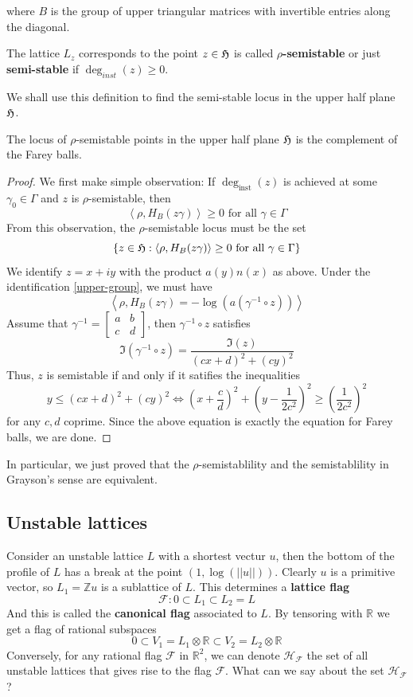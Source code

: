 where $B$ is the group of upper triangular matrices with invertible entries along the diagonal. 
\begin{definition}
  The lattice $L_z$ corresponds to the point $z \in \operatorname{\mathfrak{H}}$ is called \textbf{$\rho$-semistable} or just \textbf{semi-stable}
  if $\deg_{inst}(z) \ge 0$.
\end{definition}
We shall use this definition to find the semi-stable locus in the upper half plane $\operatorname{\mathfrak{H}}$. 
\begin{prop}
  The locus of $\rho$-semistable points in the upper half plane $\operatorname{\mathfrak{H}}$ is the 
  complement of the Farey balls. 
\end{prop}
\begin{proof}
  We first make simple observation: If $\deg_{\text{inst}}(z)$ is achieved at some 
  $\gamma_0 \in \Gamma$ and $z$ is $\rho$-semistable, then 
  \[\left\langle \rho, H_B(z\gamma)\right\rangle \ge 0 \mbox{ for all } \gamma \in \Gamma\]
  From this observation, the $\rho$-semistable locus must be the set 
  \[ \left\lbrace z \in \operatorname{\mathfrak{H}}: \left\langle \rho, H_B(z\gamma)\right\rangle \ge 0 \mbox{ for all } \gamma \in \Gamma \right\rbrace\]
We identify $z=x+iy$ with the product $a(y)n(x)$ as above. Under the identification \ref{upper-group}, we must have 
\[\left\langle \rho, H_B(z\gamma) = -\log(a(\gamma^{-1} \circ z)) \right\rangle\]
Assume that $\gamma^{-1} = 
\begin{bmatrix}
  a & b\\
  c & d
\end{bmatrix}$, then $\gamma^{-1} \circ z$ satisfies
\[\Im(\gamma^{-1}\circ z) = \dfrac{\Im(z)}{(cx+d)^2+(cy)^2}\]
Thus, $z$ is semistable if and only if it satifies the inequalities
\[y \le(cx+d)^2+(cy)^2  \Leftrightarrow \left(x+\dfrac{c}{d}\right)^2+\left(y-\dfrac{1}{2c^2}\right)^2 \ge \left(\dfrac{1}{2c^2}\right)^2 \]
for any $c,d$ coprime. Since the above equation is exactly the equation for Farey balls, we are done.
\end{proof}
In particular, we just proved that the $\rho$-semistablility and the semistablility in Grayson's sense 
are equivalent. 
\subsection{Unstable lattices}
Consider an unstable lattice $L$ with a shortest vectur $u$, then the bottom 
of the profile of $L$ has a break at the point $(1,\log(||u||))$. Clearly $u$ is a primitive vector, so $L_1 = \mathbb{Z}u$ 
is a sublattice of $L$. This determines a \textbf{lattice flag} 
\[\mathcal{F}: 0 \subset L_1 \subset L_2 = L\]
And this is called the \textbf{canonical flag} associated to $L$. By tensoring with $\mathbb{R}$ we get 
a flag of rational subspaces 
\[0 \subset V_1 = L_1 \otimes \mathbb{R} \subset V_2 = L_2 \otimes \mathbb{R}\]
Conversely, for any rational flag $\mathcal{F}$ in $\mathbb{R}^2$, we can denote $\mathcal{H}_\mathcal{F}$ the set of all 
unstable lattices that gives rise to the flag $\mathcal{F}$. What can we say about the set 
$\mathcal{H}_\mathcal{F}$? 

